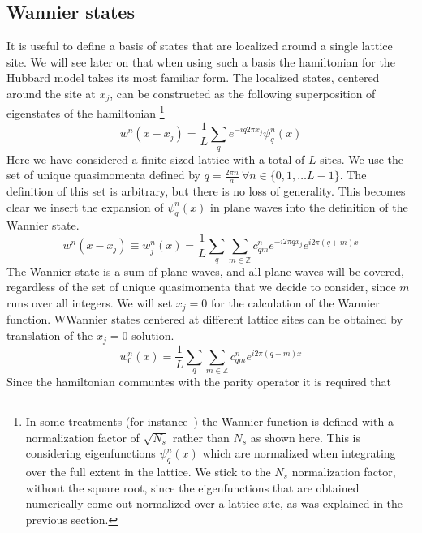\documentclass[11pt,letter]{article}
\begin{document}
\subsection{Wannier states} 
\label{sec:1Dlattice}

It is useful to define a basis of states that are localized around a single
lattice site.  We will see later on that when using such a basis the
hamiltonian for the Hubbard model takes its most familiar form.    The
localized states, centered around the site at $x_{j}$, can be constructed as
the following superposition of eigenstates of the hamiltonian \footnote{In some
treatments (for instance~\cite{salomon2013many}) the Wannier function is
defined with a normalization factor of $\sqrt{N_{s}}$  rather than $N_{s}$ as
shown here.   This is considering eigenfunctions $\psi_{q}^{n}(x)$ which are
normalized when integrating over the full extent in the lattice.  We stick to
the $N_{s}$ normalization factor, without the square root, since the
eigenfunctions that are obtained numerically come out normalized over a lattice
site, as was explained in the previous section.} 
\begin{equation} w^{n}(x-x_{j}) =  \frac{1}{L} \sum_{q}  e^{-i q 2\pi x_{j} }
\psi_{q}^{n}(x) \label{eq:wannier} \end{equation} 
Here we have considered a
finite sized lattice with a total of $L$ sites.  We use the set of unique
quasimomenta defined by $q = \frac{2\pi n}{a} \  \forall n \in \lbrace
0,1,\ldots L-1\rbrace$.  The definition of this set is arbitrary, but there is
no loss of generality.   This becomes clear we insert the
expansion of $\psi_{q}^{n}(x)$ in plane waves into the definition of the
Wannier state. 
\begin{equation}
 w^{n}(x-x_{j}) \equiv w_{j}^{n}(x)= 
    \frac{1}{L} \sum_{q}  
   \sum_{m \in \mathbb{Z}} 
   c_{qm}^{n} 
   e^{-i 2\pi q x_{j} }  
   e^{i 2\pi(q+m)x} 
\end{equation}
The Wannier state is a sum of plane waves, and all plane waves will be covered,
regardless of the set of unique quasimomenta that we decide to consider, since
$m$ runs over all integers.  We will set $x_{j}=0$ for the calculation of the
Wannier function.  WWannier states centered at different lattice sites can be
obtained by translation of the $x_{j}=0$ solution. 
\begin{equation}
  w_{0}^{n}(x)= 
    \frac{1}{L} \sum_{q}  
   \sum_{m \in \mathbb{Z}} 
   c_{qm}^{n} 
   e^{i 2\pi(q+m)x} 
\end{equation}
Since the hamiltonian communtes with the parity operator it is required that
\end{document}
